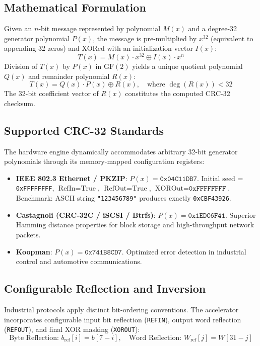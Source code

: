\documentclass[11pt,a4paper]{article}
\begin{document}
\subsection{Mathematical Formulation}
Given an $n$-bit message represented by polynomial $M(x)$ and a degree-32 generator polynomial $P(x)$, the message is pre-multiplied by $x^{32}$ (equivalent to appending 32 zeros) and XORed with an initialization vector $I(x)$:
\begin{equation}
    T(x) = M(x) \cdot x^{32} \oplus I(x) \cdot x^n
\end{equation}
Division of $T(x)$ by $P(x)$ in $\text{GF}(2)$ yields a unique quotient polynomial $Q(x)$ and remainder polynomial $R(x)$:
\begin{equation}
    T(x) = Q(x) \cdot P(x) \oplus R(x), \quad \text{where } \deg(R(x)) < 32
\end{equation}
The 32-bit coefficient vector of $R(x)$ constitutes the computed CRC-32 checksum.

\subsection{Supported CRC-32 Standards}
The hardware engine dynamically accommodates arbitrary 32-bit generator polynomials through its memory-mapped configuration registers:
\begin{itemize}
    \item \textbf{IEEE 802.3 Ethernet / PKZIP}: $P(x) = \texttt{0x04C11DB7}$. Initial seed = \texttt{0xFFFFFFFF}, $\text{RefIn} = \text{True}$, $\text{RefOut} = \text{True}$, $\text{XOROut} = \texttt{0xFFFFFFFF}$. Benchmark: ASCII string \texttt{"123456789"} produces exactly \texttt{0xCBF43926}.
    \item \textbf{Castagnoli (CRC-32C / iSCSI / Btrfs)}: $P(x) = \texttt{0x1EDC6F41}$. Superior Hamming distance properties for block storage and high-throughput network packets.
    \item \textbf{Koopman}: $P(x) = \texttt{0x741B8CD7}$. Optimized error detection in industrial control and automotive communications.
\end{itemize}

\subsection{Configurable Reflection and Inversion}
Industrial protocols apply distinct bit-ordering conventions. The accelerator incorporates configurable input bit reflection (\texttt{REFIN}), output word reflection (\texttt{REFOUT}), and final XOR masking (\texttt{XOROUT}):
\begin{equation}
    \text{Byte Reflection: } b_{\text{ref}}[i] = b[7-i], \quad \text{Word Reflection: } W_{\text{ref}}[j] = W[31-j]
\end{equation}
\end{document}
